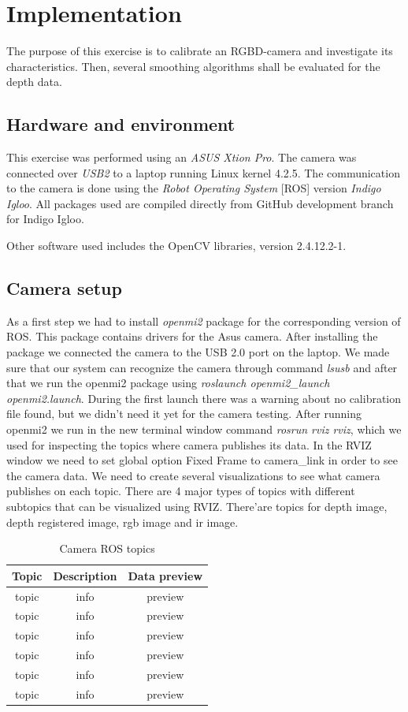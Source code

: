 \documentclass[11pt]{article}
\begin{document}
\section{Implementation}
The purpose of this exercise is to calibrate an RGBD-camera and investigate its characteristics. Then, several smoothing algorithms shall be evaluated for the depth data.
\subsection{Hardware and environment}
This exercise was performed using an \emph{ASUS Xtion Pro}. The camera was connected over \emph{USB2} to a laptop running Linux kernel 4.2.5. The communication to the camera is done using the \emph{Robot Operating System} [ROS] version \emph{Indigo Igloo}. All packages used are compiled directly from GitHub development branch for Indigo Igloo. \par
Other software used includes the OpenCV libraries, version 2.4.12.2-1.
\subsection{Camera setup}
As a first step we had to install \emph{openmi2} package for the corresponding version of ROS. This package contains drivers for the Asus camera. After installing the package we connected the camera to the USB 2.0 port on the laptop. We made sure that our system can recognize the camera through command \emph{lsusb} and after that we run the openmi2 package using \emph{roslaunch openmi2_launch openmi2.launch}. During the first launch there was a warning about no calibration file found, but we didn't need it yet for the camera testing. After running openmi2 we run in the new terminal window command \emph{rosrun rviz rviz}, which we used for inspecting the topics where camera publishes its data. In the RVIZ window we need to set global option Fixed Frame to camera_link in order to see the camera data. We need to create several visualizations to see what camera publishes on each topic. There are 4 major types of topics with different subtopics that can be visualized using RVIZ. There'are topics for depth image, depth registered image, rgb image and ir image.  \par
\begin{table}[h!]
  \centering
  \caption{Camera ROS topics}
  \label{tab:table1}
  \begin{tabular}{ccc}
    \toprule
    Topic & Description & Data preview\\
    \midrule
    topic & info & preview\\
    topic & info & preview\\
    topic & info & preview\\
    topic & info & preview\\
    topic & info & preview\\
    topic & info & preview\\
    \bottomrule
  \end{tabular}
\end{table}
\end{document}
